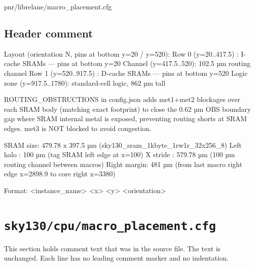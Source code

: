 \begin{relocated}{pnr/librelane/macro_placement.cfg}

\subsection*{Header comment}

\begin{textblock}
Layout (orientation N, pins at bottom y=20 / y=520):
  Row 0 (y=20..417.5)  : I-cache SRAMs — pins at bottom y=20
  Channel (y=417.5..520): 102.5 µm routing channel
  Row 1 (y=520..917.5) : D-cache SRAMs — pins at bottom y=520
  Logic zone (y=917.5..1780): standard-cell logic, 862 µm tall

ROUTING_OBSTRUCTIONS in config.json adds met1+met2 blockages over
each SRAM body (matching exact footprint) to close the 0.62 µm OBS
boundary gap where SRAM internal metal is exposed, preventing
routing shorts at SRAM edges. met3 is NOT blocked to avoid congestion.

SRAM size: 479.78 x 397.5 µm  (sky130_sram_1kbyte_1rw1r_32x256_8)
Left halo : 100 µm  (tag SRAM left edge at x=100)
X stride  : 579.78 µm  (100 µm routing channel between macros)
Right margin: 481 µm (from last macro right edge x=2898.9 to core right x=3380)

Format: <instance_name> <x> <y> <orientation>
\end{textblock}

\end{relocated}

\section{\texttt{sky130/cpu/macro\_placement.cfg}}\label{tm:pd:sky130-cpu-macro-placement-cfg}

This section holds comment text that was in the source file. The text is unchanged. Each line has no leading comment marker and no indentation.

